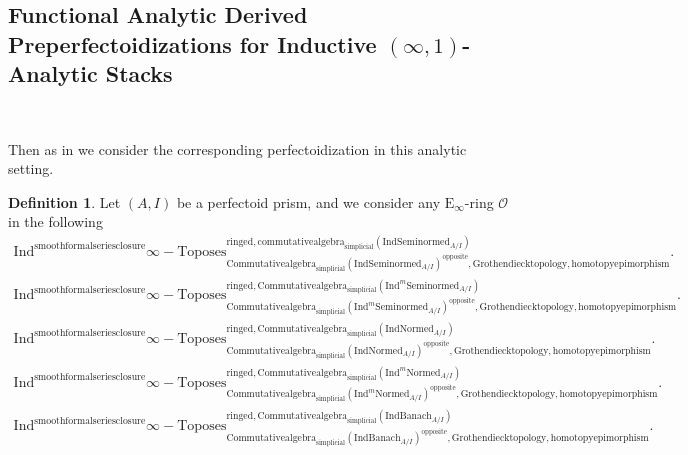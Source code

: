 \documentclass[11pt]{book}
\theoremstyle{definition}
\newtheorem{definition}[theorem]{Definition}
\numberwithin{equation}{section}
\begin{document}
\newpage

\subsection{Functional Analytic Derived Preperfectoidizations for Inductive $(\infty,1)$-Analytic Stacks}

\

\noindent Then as in \cite[Definition 8.2]{12BS} we consider the corresponding perfectoidization in this analytic setting. 


\begin{definition}
Let $(A,I)$ be a perfectoid prism, and we consider any $\mathrm{E}_\infty$-ring $\mathcal{O}$ in the following
\begin{align}
\mathrm{Ind}^\text{smoothformalseriesclosure}\infty-\mathrm{Toposes}^{\mathrm{ringed},\mathrm{commutativealgebra}_{\mathrm{simplicial}}(\mathrm{Ind}\mathrm{Seminormed}_{A/I})}_{\mathrm{Commutativealgebra}_{\mathrm{simplicial}}(\mathrm{Ind}\mathrm{Seminormed}_{A/I})^\mathrm{opposite},\mathrm{Grothendiecktopology,homotopyepimorphism}}. \\
\mathrm{Ind}^\text{smoothformalseriesclosure}\infty-\mathrm{Toposes}^{\mathrm{ringed},\mathrm{Commutativealgebra}_{\mathrm{simplicial}}(\mathrm{Ind}^m\mathrm{Seminormed}_{A/I})}_{\mathrm{Commutativealgebra}_{\mathrm{simplicial}}(\mathrm{Ind}^m\mathrm{Seminormed}_{A/I})^\mathrm{opposite},\mathrm{Grothendiecktopology,homotopyepimorphism}}.\\
\mathrm{Ind}^\text{smoothformalseriesclosure}\infty-\mathrm{Toposes}^{\mathrm{ringed},\mathrm{Commutativealgebra}_{\mathrm{simplicial}}(\mathrm{Ind}\mathrm{Normed}_{A/I})}_{\mathrm{Commutativealgebra}_{\mathrm{simplicial}}(\mathrm{Ind}\mathrm{Normed}_{A/I})^\mathrm{opposite},\mathrm{Grothendiecktopology,homotopyepimorphism}}.\\
\mathrm{Ind}^\text{smoothformalseriesclosure}\infty-\mathrm{Toposes}^{\mathrm{ringed},\mathrm{Commutativealgebra}_{\mathrm{simplicial}}(\mathrm{Ind}^m\mathrm{Normed}_{A/I})}_{\mathrm{Commutativealgebra}_{\mathrm{simplicial}}(\mathrm{Ind}^m\mathrm{Normed}_{A/I})^\mathrm{opposite},\mathrm{Grothendiecktopology,homotopyepimorphism}}.\\
\mathrm{Ind}^\text{smoothformalseriesclosure}\infty-\mathrm{Toposes}^{\mathrm{ringed},\mathrm{Commutativealgebra}_{\mathrm{simplicial}}(\mathrm{Ind}\mathrm{Banach}_{A/I})}_{\mathrm{Commutativealgebra}_{\mathrm{simplicial}}(\mathrm{Ind}\mathrm{Banach}_{A/I})^\mathrm{opposite},\mathrm{Grothendiecktopology,homotopyepimorphism}}.\\

\end{align}
\end{definition}
\end{document}
